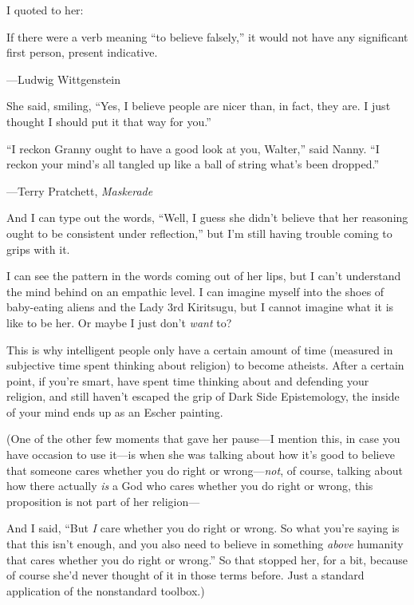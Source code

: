 {
 I quoted to her:}

{
 If there were a verb meaning ``to believe
falsely,'' it would not have any significant first
person, present indicative.}

{\raggedleft
 {}---Ludwig Wittgenstein
\par}


\bigskip

{
 She said, smiling, ``Yes, I believe people are
nicer than, in fact, they are. I just thought I should put it that way
for you.''}

{
 ``I reckon Granny ought to have a good look at
you, Walter,'' said Nanny. ``I
reckon your mind's all tangled up like a ball of string
what's been dropped.''}

{\raggedleft
 {}---Terry Pratchett, \textit{Maskerade}
\par}


\bigskip

{
 And I can type out the words, ``Well, I guess she
didn't believe that her reasoning ought to be
consistent under reflection,'' but
I'm still having trouble coming to grips with it.}

{
 I can see the pattern in the words coming out of her lips, but I
can't understand the mind behind on an empathic level.
I can imagine myself into the shoes of baby-eating aliens and the Lady
3rd Kiritsugu, but I cannot imagine what it is like to be her. Or maybe
I just don't \textit{want} to?}

{
 This is why intelligent people only have a certain amount of time
(measured in subjective time spent thinking about religion) to become
atheists. After a certain point, if you're smart, have
spent time thinking about and defending your religion, and still
haven't escaped the grip of Dark Side Epistemology, the
inside of your mind ends up as an Escher painting.}

{
 (One of the other few moments that gave her pause---I mention
this, in case you have occasion to use it---is when she was talking
about how it's good to believe that someone cares
whether you do right or wrong---\textit{not}, of course, talking about
how there actually \textit{is} a God who cares whether you do right or
wrong, this proposition is not part of her religion---}

{
 And I said, ``But \textit{I} care whether you do
right or wrong. So what you're saying is that this
isn't enough, and you also need to believe in something
\textit{above} humanity that cares whether you do right or
wrong.'' So that stopped her, for a bit, because of
course she'd never thought of it in those terms before.
Just a standard application of the nonstandard toolbox.)}

